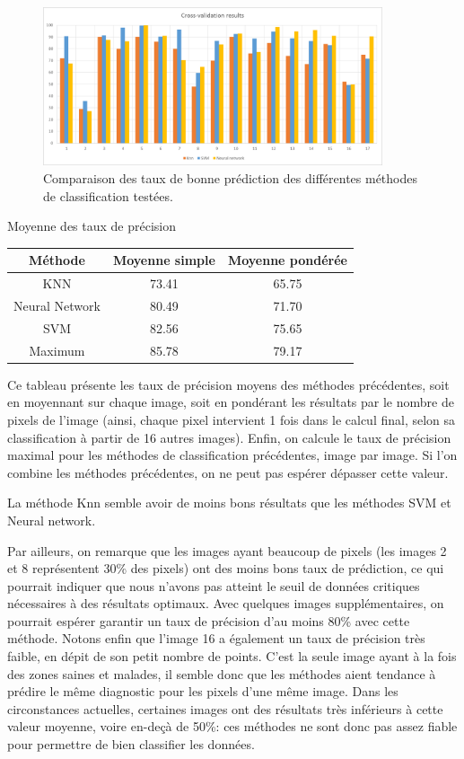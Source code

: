 \documentclass[a4paper,10pt]{report}
\begin{document}
\begin{figure}[htbp]
  \caption{Comparaison des taux de bonne prédiction des différentes méthodes de classification testées.}
  \centering
  \includegraphics[width=10cm]{Compared_CV.png}
\end{figure}

\begin{center}
Moyenne des taux de précision\\

\begin{tabular}{|c|c|c|}  
  \hline
  Méthode & Moyenne simple & Moyenne pondérée\\
  \hline
  KNN & 73.41 & 65.75\\
  Neural Network & 80.49 & 71.70\\  
  SVM & 82.56 & 75.65\\
  \hline
  Maximum & 85.78 & 79.17\\
  \hline
\end{tabular}
\end{center}

Ce tableau présente les taux de précision moyens des méthodes précédentes, soit en moyennant sur chaque image, soit en pondérant les résultats par le nombre de pixels de l'image (ainsi, chaque pixel intervient 1 fois dans le calcul final, selon sa classification à partir de 16 autres images).
Enfin, on calcule le taux de précision maximal pour les méthodes de classification précédentes, image par image. Si l'on combine les méthodes précédentes, on ne peut pas espérer dépasser cette valeur.


La méthode Knn semble avoir de moins bons résultats que les méthodes SVM et Neural network. 

Par ailleurs, on remarque que les images ayant beaucoup de pixels (les images 2 et 8 représentent 30\% des pixels) ont des moins bons taux de prédiction, ce qui pourrait indiquer que nous n'avons pas atteint le seuil de données critiques nécessaires à des résultats optimaux. Avec quelques images supplémentaires, on pourrait espérer garantir un taux de précision d'au moins 80\% avec cette méthode. 
Notons enfin que l'image 16 a également un taux de précision très faible, en dépit de son petit nombre de points. C'est la seule image ayant à la fois des zones saines et malades, il semble donc que les méthodes aient tendance à prédire le même diagnostic pour les pixels d'une même image.
Dans les circonstances actuelles, certaines images ont des résultats très inférieurs à cette valeur moyenne, voire en-deçà de 50\%: ces méthodes ne sont donc pas assez fiable pour permettre de bien classifier les données.
\end{document}
